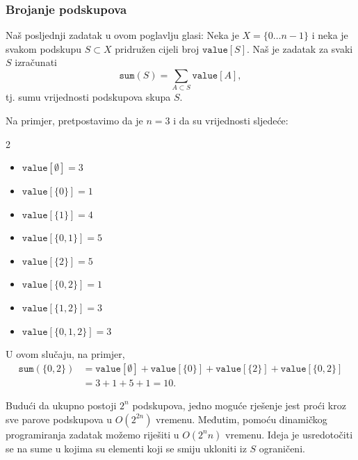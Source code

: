 \subsubsection{Brojanje podskupova}

Naš posljednji zadatak u ovom poglavlju glasi:
Neka je $X=\{0 \ldots n-1\}$ i neka je svakom podskupu $S \subset X$
pridružen cijeli broj $\texttt{value}[S]$.
Naš je zadatak za svaki $S$ izračunati
\[\texttt{sum}(S) = \sum_{A \subset S} \texttt{value}[A],\]
tj. sumu vrijednosti podskupova skupa $S$.

Na primjer, pretpostavimo da je $n=3$ i da su vrijednosti sljedeće:
\begin{multicols}{2}
\begin{itemize}
\item $\texttt{value}[\emptyset] = 3$
\item $\texttt{value}[\{0\}] = 1$
\item $\texttt{value}[\{1\}] = 4$
\item $\texttt{value}[\{0,1\}] = 5$
\item $\texttt{value}[\{2\}] = 5$
\item $\texttt{value}[\{0,2\}] = 1$
\item $\texttt{value}[\{1,2\}] = 3$
\item $\texttt{value}[\{0,1,2\}] = 3$
\end{itemize}
\end{multicols}
U ovom slučaju, na primjer,
\begin{equation*}
\begin{split}
\texttt{sum}(\{0,2\}) &= \texttt{value}[\emptyset]+\texttt{value}[\{0\}]+\texttt{value}[\{2\}]+\texttt{value}[\{0,2\}] \\ 
                      &= 3 + 1 + 5 + 1 = 10.
\end{split}
\end{equation*}

Budući da ukupno postoji $2^n$ podskupova,
jedno moguće rješenje jest proći kroz sve
parove podskupova u $O(2^{2n})$ vremenu.
Međutim, pomoću dinamičkog programiranja
zadatak možemo riješiti u $O(2^n n)$ vremenu.
Ideja je usredotočiti se na sume u kojima su
elementi koji se smiju ukloniti iz $S$ ograničeni.

